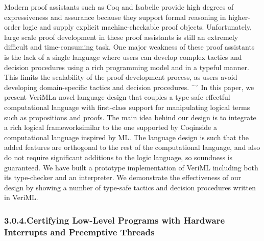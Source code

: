 \documentclass[12pt,twoside]{article}
\begin{document}
Modern proof assistants such as Coq and Isabelle provide high degrees
of expressiveness and assurance because they support formal reasoning
in higher-order logic and supply explicit machine-checkable proof
objects. Unfortunately, large scale proof development in these proof
assistants is still an extremely difficult and time-consuming
task. One major weakness of these proof assistants is the lack of a
single language where users can develop complex tactics and decision
procedures using a rich programming model and in a typeful
manner. This limits the scalability of the proof development process,
as users avoid developing domain-specific tactics and decision
procedures.
¯˘
In this paper, we present VeriML\textemdash{}a novel language design that
couples a type-safe effectful computational language with first-class
support for manipulating logical terms such as propositions and
proofs. The main idea behind our design is to integrate a rich logical
framework\textemdash{}similar to the one supported by Coq\textemdash{}inside a
computational language inspired by ML. The language design is such
that the added features are orthogonal to the rest of the
computational language, and also do not require significant additions
to the logic language, so soundness is guaranteed. We have built a
prototype implementation of VeriML including both its type-checker and
an interpreter. We demonstrate the effectiveness of our design by
showing a number of type-safe tactics and decision procedures written
in VeriML.%

\subsubsection{3.0.4.\hspace*{0.5em}Certifying Low-Level Programs with Hardware Interrupts and Preemptive Threads}\label{sec-certifying-low-level-programs-with-hardware-interrupts-and-preemptive-threads}%
\end{document}
